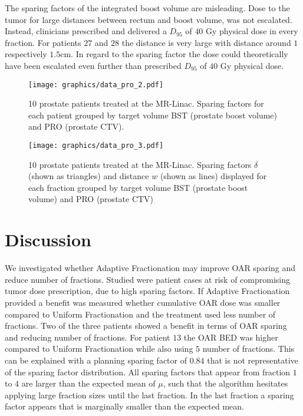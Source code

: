\documentclass[\relativeRoot/ada.tex]{subfiles}
\begin{document}
The sparing factors of the integrated boost volume are misleading. Dose to the tumor for large distances between rectum and boost volume, was not escalated. Instead, clinicians prescribed and delivered a $D_{95}$ of $40$ Gy physical dose in every fraction. For patients $27$ and $28$ the distance is very large with distance around $1$ respectively $1.5$cm. In regard to the sparing factor the dose could theoretically have been escalated even further than prescribed $D_{95}$ of $40$ Gy physical dose.

\begin{figure}[!htb]
    \centering
    \texttt{[image: graphics/data\_pro\_2.pdf]}
    \caption{10 prostate patients treated at the MR-Linac. Sparing factors for each patient grouped by target volume BST (prostate boost volume) and PRO (prostate CTV).}
    \label{fig:data_pro_2}
\end{figure}

\begin{figure}[!htb]
    \centering
    \texttt{[image: graphics/data\_pro\_3.pdf]}
    \caption{10 prostate patients treated at the MR-Linac. Sparing factors $\delta$ (shown as triangles) and distance $w$ (shown as lines) displayed for each fraction grouped by target volume BST (prostate boost volume) and PRO (prostate CTV)}
    \label{fig:data_pro_3}
\end{figure}

\section{Discussion}

We investigated whether Adaptive Fractionation may improve OAR sparing and reduce number of fractions. Studied were patient cases at risk of compromising tumor dose prescription, due to high sparing factors. If Adaptive Fractionation provided a benefit was measured whether cumulative OAR dose was smaller compared to Uniform Fractionation and the treatment used less number of fractions. Two of the three patients showed a benefit in terms of OAR sparing and reducing number of fractions. For patient $13$ the OAR BED was higher compared to Uniform Fractionation while also using $5$ number of fractions. This can be explained with a planning sparing factor of $0.84$ that is not representative of the sparing factor distribution. All sparing factors that appear from fraction $1$ to $4$ are larger than the expected mean of $\mu$, such that the algorithm hesitates applying large fraction sizes until the last fraction. In the last fraction a sparing factor appears that is marginally smaller than the expected mean.
\end{document}
